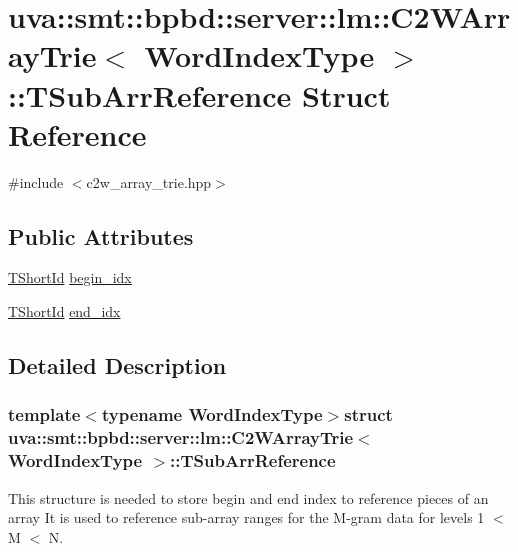 \hypertarget{structuva_1_1smt_1_1bpbd_1_1server_1_1lm_1_1_c2_w_array_trie_1_1_t_sub_arr_reference}{}\section{uva\+:\+:smt\+:\+:bpbd\+:\+:server\+:\+:lm\+:\+:C2\+W\+Array\+Trie$<$ Word\+Index\+Type $>$\+:\+:T\+Sub\+Arr\+Reference Struct Reference}
\label{structuva_1_1smt_1_1bpbd_1_1server_1_1lm_1_1_c2_w_array_trie_1_1_t_sub_arr_reference}


{\ttfamily \#include $<$c2w\+\_\+array\+\_\+trie.\+hpp$>$}

\subsection*{Public Attributes}
\begin{DoxyCompactItemize}
\item 
\hyperlink{namespaceuva_1_1smt_1_1bpbd_1_1server_1_1lm_1_1identifiers_a33043a191e9a637dea742a89d23c8bdc}{T\+Short\+Id} \hyperlink{structuva_1_1smt_1_1bpbd_1_1server_1_1lm_1_1_c2_w_array_trie_1_1_t_sub_arr_reference_a256f6783e54013b0ebb38c1faf006d53}{begin\+\_\+idx}
\item 
\hyperlink{namespaceuva_1_1smt_1_1bpbd_1_1server_1_1lm_1_1identifiers_a33043a191e9a637dea742a89d23c8bdc}{T\+Short\+Id} \hyperlink{structuva_1_1smt_1_1bpbd_1_1server_1_1lm_1_1_c2_w_array_trie_1_1_t_sub_arr_reference_ad05a303eb8f2a85b958a2f7b775d534a}{end\+\_\+idx}
\end{DoxyCompactItemize}


\subsection{Detailed Description}
\subsubsection*{template$<$typename Word\+Index\+Type$>$struct uva\+::smt\+::bpbd\+::server\+::lm\+::\+C2\+W\+Array\+Trie$<$ Word\+Index\+Type $>$\+::\+T\+Sub\+Arr\+Reference}

This structure is needed to store begin and end index to reference pieces of an array It is used to reference sub-\/array ranges for the M-\/gram data for levels 1 $<$ M $<$ N.

